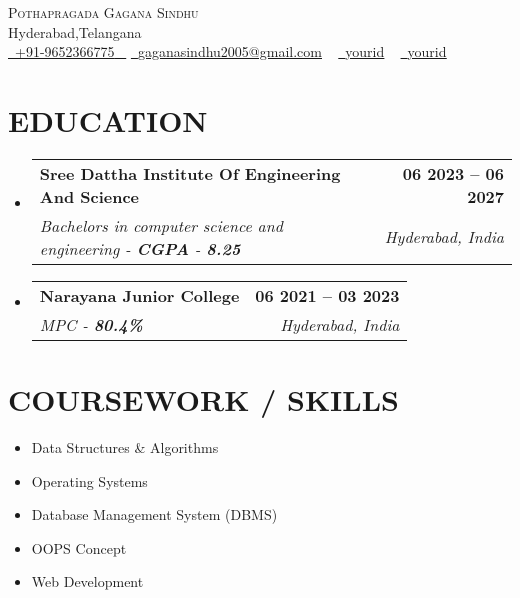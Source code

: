 \documentclass[letterpaper,11pt]{article}
\makeatletter
\newcommand{\resumeSubheading}[4]{
  \vspace{-2pt}\item
    \begin{tabular*}{1.0\textwidth}[t]{l@{\extracolsep{\fill}}r}
      \textbf{\large#1} & \textbf{\small #2} \\
      \textit{\large#3} & \textit{\small #4} \\
     
    \end{tabular*}\vspace{-7pt}
}
\newcommand{\resumeSubHeadingListStart}{\begin{itemize}[leftmargin=0.0in, label={}]}
\newcommand{\resumeSubHeadingListEnd}{\end{itemize}}
\makeatother
\begin{document}




\begin{center}
    {\Huge \scshape Pothapragada Gagana Sindhu} \\ \vspace{1pt}
    Hyderabad,Telangana \\ \vspace{1pt}
    \small \href{tel:+xxxxxxxxxxxx}{ \raisebox{-0.1\height}\faPhone\ \underline{+91-9652366775} ~} \href{mailto:rizwanmalikdev@gmail.com}{\raisebox{-0.2\height}\faEnvelope\  \underline{gaganasindhu2005@gmail.com}} ~
    \href{https://www.linkedin.com/in/gaganasindhu-pothapragada-a392612a5/}{\raisebox{-0.2\height}\faLinkedinSquare\ \underline{yourid}}  ~
    \href{https://github.com/Gagana-sindhu}{\raisebox{-0.2\height}\faGithub\ \underline{yourid}} ~

    \vspace{-8pt}
\end{center}




\section{EDUCATION}
  \resumeSubHeadingListStart
    \resumeSubheading
      {Sree Dattha Institute Of Engineering And Science}{06 2023 -- 06 2027}
      {Bachelors in computer science and engineering - \textbf{CGPA} - \textbf{8.25}}{Hyderabad, India}
  \resumeSubHeadingListEnd
 
  \resumeSubHeadingListStart
    \resumeSubheading
      {Narayana Junior College }{06 2021 -- 03 2023}
      {MPC  - \textbf{80.4\%}}{Hyderabad, India}
  \resumeSubHeadingListEnd


\section{COURSEWORK / SKILLS}
        \begin{multicols}{4}
            \begin{itemize}[itemsep=-2pt, parsep=5pt]
                \item Data Structures \& Algorithms
                \item Operating Systems
                \item Database Management System (DBMS)
                \item OOPS Concept
                \item Web Development
            \end{itemize}
        \end{multicols}
        \vspace*{2.0\multicolsep}
\end{document}
